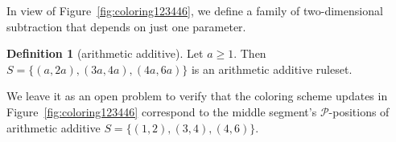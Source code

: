 \documentclass{amsart}
\theoremstyle{plain}
\theoremstyle{definition}
\newtheorem{defi}[thm]{Definition}
\renewcommand{\P}{\ensuremath{\mathcal P}}
\newcommand{\x}{\boldsymbol x}
\newcommand{\y}{\boldsymbol y}
\renewcommand{\ge}{\geqslant}
\begin{document}
In view of Figure~\ref{fig:coloring123446}, we define a family of {\sc two-dimensional subtraction} that depends on just one parameter. 
\begin{defi}[{\sc arithmetic additive}]
Let $a\ge 1$. Then 
{\small $
S=\{(a,2a),(3a,4a),(4a,6a)\}
$ }is an {\sc arithmetic additive} ruleset. 
\end{defi}
We leave it as an open problem to verify that the coloring scheme updates in Figure~\ref{fig:coloring123446} correspond to the middle segment's \P-positions of {\sc arithmetic additive} $S=\{(1,2),(3,4),(4,6)\}$.  
\begin{figure}[htp!]
\begin{center}
\end{center}
\end{figure}
\end{document}
